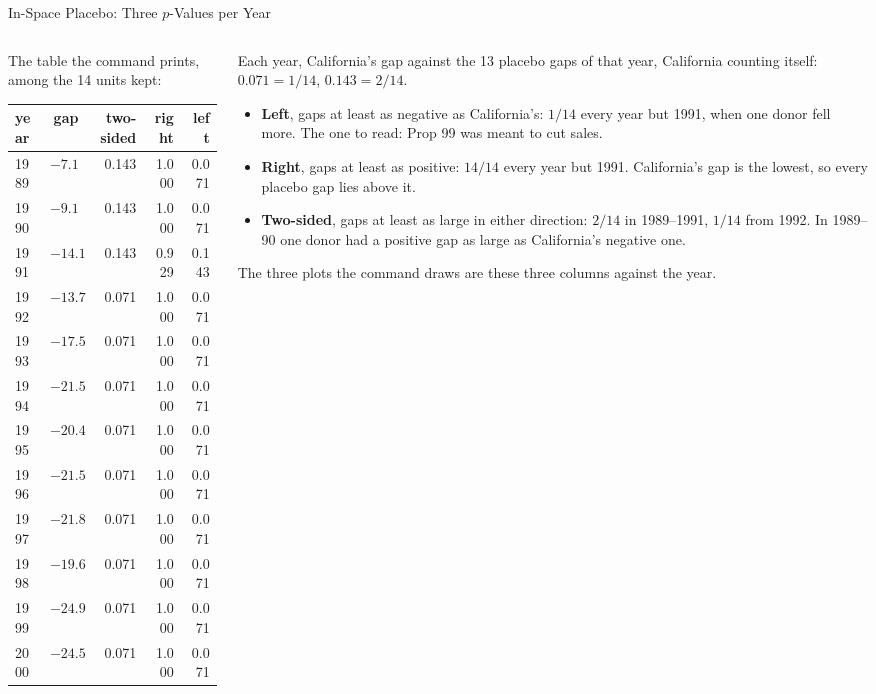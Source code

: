 \documentclass[main.tex]{subfiles}
\begin{document}
\begin{frame}{In-Space Placebo: Three $p$-Values per Year}
  \begin{columns}[T]
    \begin{column}{0.44\textwidth}
      \footnotesize
      The table the command prints, among the 14 units kept:
      \smallskip

      {\scriptsize
      \begin{tabular}{@{}lrrrr@{}}
        \toprule
        year & gap & two-sided & right & left \\
        \midrule
        1989 & $-7.1$ & 0.143 & 1.000 & 0.071 \\
        1990 & $-9.1$ & 0.143 & 1.000 & 0.071 \\
        1991 & $-14.1$ & 0.143 & 0.929 & 0.143 \\
        1992 & $-13.7$ & 0.071 & 1.000 & 0.071 \\
        1993 & $-17.5$ & 0.071 & 1.000 & 0.071 \\
        1994 & $-21.5$ & 0.071 & 1.000 & 0.071 \\
        1995 & $-20.4$ & 0.071 & 1.000 & 0.071 \\
        1996 & $-21.5$ & 0.071 & 1.000 & 0.071 \\
        1997 & $-21.8$ & 0.071 & 1.000 & 0.071 \\
        1998 & $-19.6$ & 0.071 & 1.000 & 0.071 \\
        1999 & $-24.9$ & 0.071 & 1.000 & 0.071 \\
        2000 & $-24.5$ & 0.071 & 1.000 & 0.071 \\
        \bottomrule
      \end{tabular}}
    \end{column}
    \begin{column}{0.54\textwidth}
      \footnotesize
      Each year, California's gap against the 13 placebo gaps of that year,
      California counting itself: $0.071 = 1/14$, $0.143 = 2/14$.
      \begin{itemize}\footnotesize
        \item \textbf{Left}, gaps at least as negative as California's:
          $1/14$ every year but 1991, when one donor fell more. The one to
          read: Prop 99 was meant to cut sales.
        \item \textbf{Right}, gaps at least as positive: $14/14$ every year
          but 1991. California's gap is the lowest, so every placebo gap lies
          above it.
        \item \textbf{Two-sided}, gaps at least as large in either direction:
          $2/14$ in 1989--1991, $1/14$ from 1992. In 1989--90 one donor had a
          positive gap as large as California's negative one.
      \end{itemize}
      The three plots the command draws are these three columns against the
      year.
    \end{column}
  \end{columns}
\end{frame}
\end{document}
